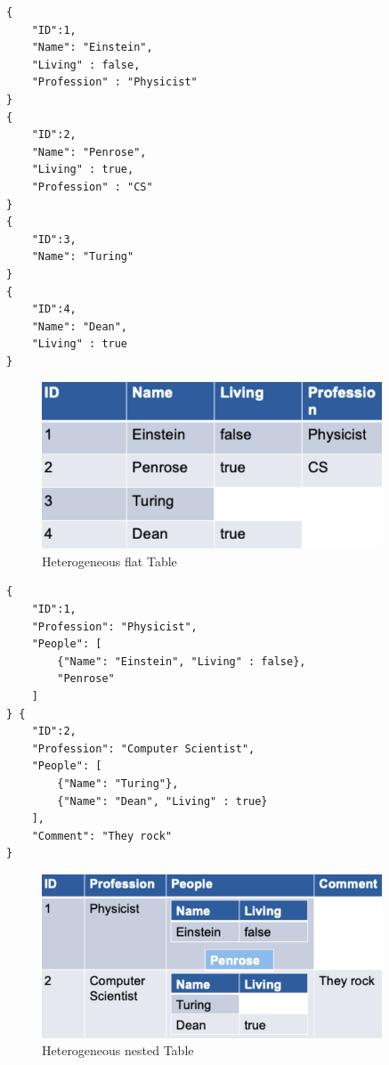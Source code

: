 \begin{minipage}{0.55\textwidth}
\begin{lstlisting}[style=json,caption={JSON Code for a heterogeneous and flat table.}]
{
    "ID":1,
    "Name": "Einstein",
    "Living" : false,
    "Profession" : "Physicist"
}
{
    "ID":2,
    "Name": "Penrose",
    "Living" : true,
    "Profession" : "CS"
}
{
    "ID":3,
    "Name": "Turing"
}
{
    "ID":4,
    "Name": "Dean",
    "Living" : true
}
\end{lstlisting}
\end{minipage}
\hfill
\begin{minipage}{0.45\textwidth}
\begin{figure}[H]
    \centering
    \includegraphics[width=0.9\textwidth]{Figures/FlatHeterogeneous.png}
    \caption{Heterogeneous flat Table}
\end{figure}
\end{minipage}


\begin{minipage}{0.55\textwidth}
\begin{lstlisting}[style=json,caption={JSON Code for a heterogeneous and nested table.}]
{
    "ID":1,
    "Profession": "Physicist",
    "People": [
        {"Name": "Einstein", "Living" : false},
        "Penrose"
    ]
} {
    "ID":2,
    "Profession": "Computer Scientist",
    "People": [
        {"Name": "Turing"},
        {"Name": "Dean", "Living" : true}
    ],
    "Comment": "They rock"
}
\end{lstlisting}
\end{minipage}
\hfill
\begin{minipage}{0.45\textwidth}
\begin{figure}[H]
    \centering
    \includegraphics[width=0.9\textwidth]{Figures/NestedHeterogeneous.png}
    \caption{Heterogeneous nested Table}
\end{figure}
\end{minipage}


